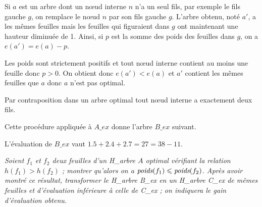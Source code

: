 \begin{Answer}
Si $a$ est un arbre dont un nœud interne $n$ n'a un seul fils, par exemple le fils gauche $g$, on remplace le nœud $n$ par son fils gauche $g$. L'arbre obtenu, noté $a'$, a les mêmes feuilles  mais les feuilles qui figuraient dans $g$ ont maintenant une hauteur diminuée de 1. Ainsi, si  $p$ est la somme des poids des feuilles dans $g$, on a $e(a') = e(a) -p$.

Les poids sont strictement positifs et tout nœud interne contient au moins une feuille donc $p>0$.
On obtient donc $e(a') < e(a)$ et $a'$ contient les mêmes feuilles que $a$ donc $a$ n'est pas optimal.

Par contraposition dans un arbre optimal tout nœud interne a exactement deux fils.

Cette procédure appliquée à $A\_{ex}$ donne l'arbre $B\_{ex}$ suivant.

\begin{center}
\end{center}

L'évaluation de $B\_{ex}$ vaut $1.5 + 2.4 + 2.7 = 27 = 38-11$.
\end{Answer}
\begin{Exercise}\it
Soient $f_1$ et $f_2$ deux feuilles d’un H\_arbre $A$ optimal vérifiant la relation $h(f_1) > h(f_2)$ ; montrer
qu’alors on a $\text{\it poids}(f_1) \le \text{\it poids}(f_2)$. Après avoir montré ce résultat, transformer le H\_arbre {\it B\_ex} en un H\_arbre {\it C\_ex} de mêmes feuilles et d’évaluation inférieure à celle de {\it C\_ex} ; on indiquera le gain d’évaluation obtenu.
\end{Exercise}
